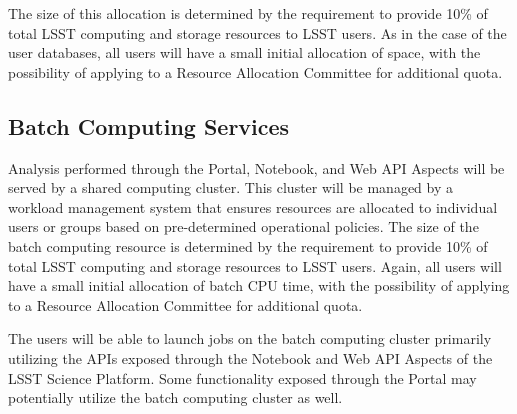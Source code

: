 The size of this allocation is determined by the \SRD requirement to provide 10\% of total LSST computing and storage resources to LSST users.
As in the case of the user databases, all users will have a small initial allocation of space, with the possibility of applying to a Resource Allocation Committee for additional quota.

\subsection{Batch Computing Services}

Analysis performed through the Portal, Notebook, and Web API Aspects will be served by a shared computing cluster.
This cluster will be managed by a workload management system that ensures resources are allocated to individual users or groups based on pre-determined operational policies.
The size of the batch computing resource is determined by the \SRD requirement to provide 10\% of total LSST computing and storage resources to LSST users.
Again, all users will have a small initial allocation of batch CPU time, with the possibility of applying to a Resource Allocation Committee for additional quota.

The users will be able to launch jobs on the batch computing cluster primarily utilizing the APIs exposed through the Notebook and Web API Aspects of the LSST Science Platform.
Some functionality exposed through the Portal may potentially utilize the batch computing cluster as well.

%
%
%
%
